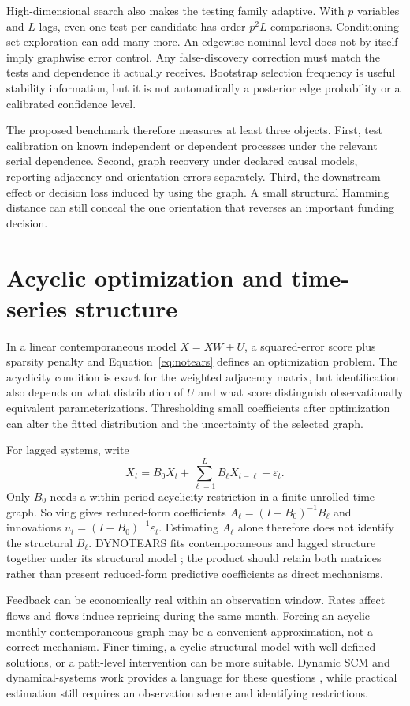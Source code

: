 High-dimensional search also makes the testing family adaptive. With
$p$ variables and $L$ lags, even one test per candidate has order
$p^2L$ comparisons. Conditioning-set exploration can add many more.
An edgewise nominal level does not by itself imply graphwise error control.
Any false-discovery correction must match the tests and dependence it
actually receives. Bootstrap selection frequency is useful stability
information, but it is not automatically a posterior edge probability
or a calibrated confidence level.

The proposed benchmark therefore measures at least three objects.
First, test calibration on known independent or dependent processes under
the relevant serial dependence. Second, graph recovery under declared
causal models, reporting adjacency and orientation errors separately.
Third, the downstream effect or decision loss induced by using the graph.
A small structural Hamming distance can still conceal the one orientation
that reverses an important funding decision.

\section{Acyclic optimization and time-series structure}
In a linear contemporaneous model $X=XW+U$, a squared-error score plus
sparsity penalty and Equation~\eqref{eq:notears} defines an optimization
problem. The acyclicity condition is exact for the weighted adjacency
matrix, but identification also depends on what distribution of $U$ and
what score distinguish observationally equivalent parameterizations.
Thresholding small coefficients after optimization can alter the fitted
distribution and the uncertainty of the selected graph.

For lagged systems, write
\[
 X_t=B_0X_t+\sum_{\ell=1}^{L}B_\ell X_{t-\ell}+\varepsilon_t.
\]
Only $B_0$ needs a within-period acyclicity restriction in a finite
unrolled time graph. Solving gives reduced-form coefficients
$A_\ell=(I-B_0)^{-1}B_\ell$ and innovations
$u_t=(I-B_0)^{-1}\varepsilon_t$. Estimating $A_\ell$ alone
therefore does not identify the structural $B_\ell$. DYNOTEARS fits
contemporaneous and lagged structure together under its structural model
\citep{pamfil2020}; the product should retain both matrices rather than
present reduced-form predictive coefficients as direct mechanisms.

Feedback can be economically real within an observation window. Rates
affect flows and flows induce repricing during the same month. Forcing
an acyclic monthly contemporaneous graph may be a convenient approximation,
not a correct mechanism. Finer timing, a cyclic structural model with
well-defined solutions, or a path-level intervention can be more suitable.
Dynamic SCM and dynamical-systems work provides a language for these
questions \citep{boeken2024,bongers2022}, while practical estimation
still requires an observation scheme and identifying restrictions.

